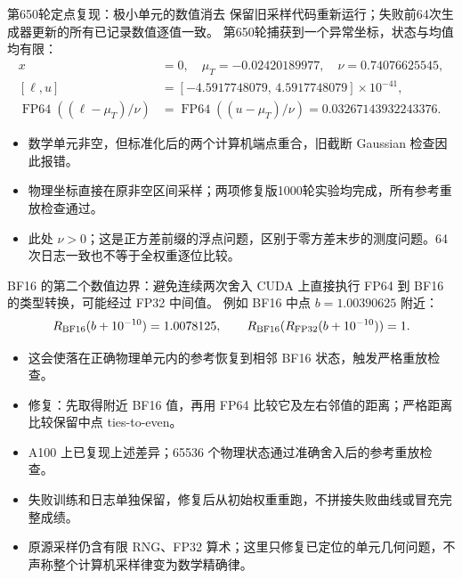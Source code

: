 \documentclass[10pt,aspectratio=169]{beamer}
\begin{document}
\begin{frame}{第650轮定点复现：极小单元的数值消去}
\small
保留旧采样代码重新运行；失败前64次生成器更新的所有已记录数值逐值一致。
第650轮捕获到一个异常坐标，状态与均值均有限：
\begin{align}
x&=0,\quad \mu_T=-0.02420189977,\quad \nu=0.74076625545,\\
[\ell,u]&=[-4.5917748079,\,4.5917748079]\times10^{-41},\\
\operatorname{FP64}((\ell-\mu_T)/\nu)
&=\operatorname{FP64}((u-\mu_T)/\nu)=0.03267143932243376.
\end{align}
\begin{itemize}\itemsep5pt
\item 数学单元非空，但标准化后的两个计算机端点重合，旧截断 Gaussian 检查因此报错。
\item 物理坐标直接在原非空区间采样；两项修复版1000轮实验均完成，所有参考重放检查通过。
\item 此处 $\nu>0$；这是正方差前缀的浮点问题，区别于零方差末步的测度问题。64次日志一致也不等于全权重逐位比较。
\end{itemize}
\end{frame}

\begin{frame}{BF16 的第二个数值边界：避免连续两次舍入}
\small
CUDA 上直接执行 FP64 到 BF16 的类型转换，可能经过 FP32 中间值。
例如 BF16 中点 $b=1.00390625$ 附近：
\begin{equation}
R_{\rm BF16}(b+10^{-10})=1.0078125,
\qquad R_{\rm BF16}(R_{\rm FP32}(b+10^{-10}))=1.
\end{equation}
\begin{itemize}\itemsep5pt
\item 这会使落在正确物理单元内的参考恢复到相邻 BF16 状态，触发严格重放检查。
\item 修复：先取得附近 BF16 值，再用 FP64 比较它及左右邻值的距离；严格距离比较保留中点 ties-to-even。
\item A100 上已复现上述差异；65536 个物理状态通过准确舍入后的参考重放检查。
\item 失败训练和日志单独保留，修复后从初始权重重跑，不拼接失败曲线或冒充完整成绩。
\item 原源采样仍含有限 RNG、FP32 算术；这里只修复已定位的单元几何问题，不声称整个计算机采样律变为数学精确律。
\end{itemize}
\end{frame}
\end{document}
